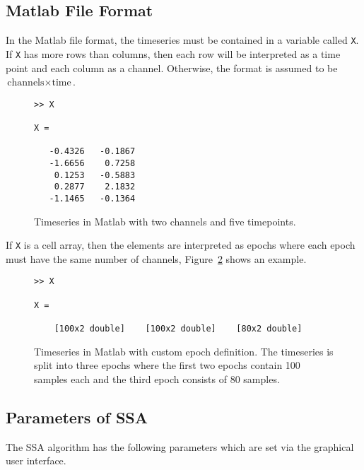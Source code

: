 \documentclass{article}
\newcommand{\1}{\ensuremath{\mathds{1}}}
\newcommand{\0}{\ensuremath{0}}
\begin{document}
\subsection{Matlab File Format}

In the Matlab file format, the timeseries must be contained in a variable
called \texttt{X}. If \texttt{X} has more rows than columns, then each row
will be interpreted as a time point and each column as a channel. Otherwise,
the format is assumed to be $\text{channels} \times \text{time}$. 

\begin{figure}[h]
\centering
\begin{boxedminipage}{10cm}
\begin{verbatim}
>> X

X =

   -0.4326   -0.1867
   -1.6656    0.7258
    0.1253   -0.5883
    0.2877    2.1832
   -1.1465   -0.1364

\end{verbatim}
\end{boxedminipage}
\caption{Timeseries in Matlab with two channels and five timepoints.
\label{fig:ex_matlabts}
}
\end{figure}

If \texttt{X} is a cell array, then the elements
are interpreted as epochs where each epoch must have the same number 
of channels, Figure~\ref{fig:ex_matlabsegs} shows
an example.

\begin{figure}[h]
\centering
\begin{boxedminipage}{10cm}
\begin{verbatim}
>> X

X = 

    [100x2 double]    [100x2 double]    [80x2 double]
\end{verbatim}
\end{boxedminipage}
\caption{Timeseries in Matlab with custom epoch definition. The timeseries is split
into three epochs where the first two epochs contain 100 samples each and the third
epoch consists of 80 samples.
\label{fig:ex_matlabsegs}
}
\end{figure}

\subsection{Parameters of SSA}
\label{sec:params}

The SSA algorithm has the following parameters which are set via the graphical user
interface.
\end{document}
